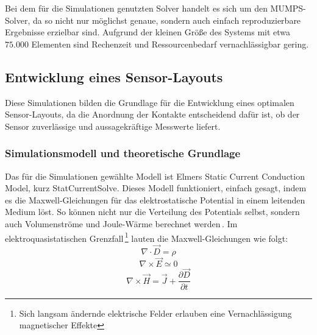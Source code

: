 \documentclass[12pt, a4paper]{article}
\begin{document}

Bei dem für die Simulationen genutzten Solver handelt es sich um den MUMPS-Solver, da so nicht nur möglichst genaue, sondern auch einfach reproduzierbare Ergebnisse erzielbar sind. Aufgrund der kleinen Größe des Systems mit etwa $75.000$ Elementen sind Rechenzeit und Ressourcenbedarf vernachlässigbar gering. 




\subsection{Entwicklung eines Sensor-Layouts}
Diese Simulationen bilden die Grundlage für die Entwicklung eines optimalen Sensor-Layouts, da die Anordnung der Kontakte entscheidend dafür ist, ob der Sensor zuverlässige und aussagekräftige Messwerte liefert.
\subsubsection{Simulationsmodell und theoretische Grundlage}
Das für die Simulationen gewählte Modell ist Elmers Static Current Conduction Model, kurz StatCurrentSolve. Dieses Modell funktioniert, einfach gesagt, indem es die Maxwell-Gleichungen für das elektrostatische Potential in einem leitenden Medium löst. So können nicht nur die Verteilung des Potentials selbst, sondern auch Volumenströme und Joule-Wärme berechnet werden\,\cite{elmerModel}.\newline
Im elektroquasistatischen Grenzfall\,\footnote{Sich langsam ändernde elektrische Felder erlauben eine Vernachlässigung magnetischer Effekte} lauten die Maxwell-Gleichungen wie folgt:
\begin{equation}
	\nabla\cdot\vec{D}=\rho
	\tag{4.1}
	\label{4.1}
\end{equation}
\begin{equation}
	\nabla\times\vec{E}\simeq0
	\tag{4.2}
	\label{4.2}
\end{equation}
\pagebreak
\begin{equation}
	\nabla\times\vec{H}=\vec{J}+\frac{\partial\vec{D}}{\partial{t}}
	\tag{4.3}
	\label{4.3}
\end{equation}
\end{document}
